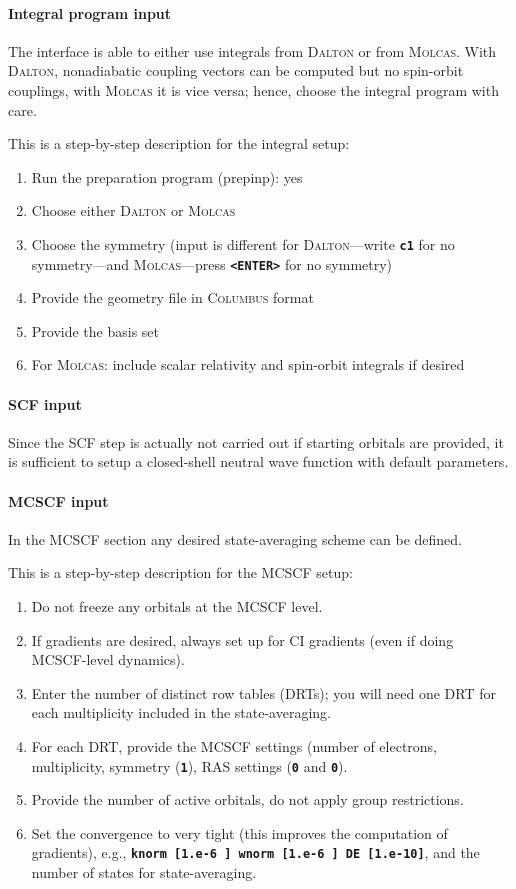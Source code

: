 \documentclass[a4paper,11pt,DIV=15,openany]{scrbook}
\newcommand{\ttt}[1]{\textbf{\texttt{#1}}}
\begin{document}
\paragraph{Integral program input}

The interface is able to either use integrals from \textsc{Dalton} or from \textsc{Molcas}.
With \textsc{Dalton}, nonadiabatic coupling vectors can be computed but no spin-orbit couplings, with \textsc{Molcas} it is vice versa; hence, choose the integral program with care.

This is a step-by-step description for the integral setup:
\begin{enumerate}
  \item Run the preparation program (prepinp): yes
  \item Choose either \textsc{Dalton} or \textsc{Molcas}
  \item Choose the symmetry (input is different for \textsc{Dalton}---write \ttt{c1} for no symmetry---and \textsc{Molcas}---press \ttt{<ENTER>} for no symmetry)
  \item Provide the geometry file in \textsc{Columbus} format
  \item Provide the basis set
  \item For \textsc{Molcas}: include scalar relativity and spin-orbit integrals if desired
\end{enumerate}

\paragraph{SCF input}

Since the SCF step is actually not carried out if starting orbitals are provided, it is sufficient to setup a closed-shell neutral wave function with default parameters.

\paragraph{MCSCF input}

In the MCSCF section any desired state-averaging scheme can be defined. 

This is a step-by-step description for the MCSCF setup:
\begin{enumerate}
  \item Do not freeze any orbitals at the MCSCF level.
  \item If gradients are desired, always set up for CI gradients (even if doing MCSCF-level dynamics).
  \item Enter the number of distinct row tables (DRTs); you will need one DRT for each multiplicity included in the state-averaging.
  \item For each DRT, provide the MCSCF settings (number of electrons, multiplicity, symmetry (\ttt{1}), RAS settings (\ttt{0} and \ttt{0}).
  \item Provide the number of active orbitals, do not apply group restrictions.
  \item Set the convergence to very tight (this improves the computation of gradients), e.g., \ttt{knorm [1.e-6 ]  wnorm [1.e-6 ]  DE [1.e-10]}, and the number of states for state-averaging.
\end{enumerate}
\end{document}
